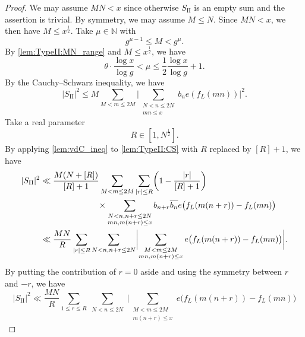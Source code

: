 \documentclass[hidelinks]{amsart}
\numberwithin{equation}{section}
\theoremstyle{plain}
\theoremstyle{definition}
\begin{document}
\begin{proof}
We may assume $MN<x$ since otherwise $S_{\mathrm{II}}$ is an empty sum
and the assertion is trivial.
By symmetry, we may assume $M\le N$.
Since $MN<x$, we then have $M\le x^{\frac{1}{2}}$.
Take $\mu\in\mathbb{N}$ with
\begin{equation}
\label{lem:TypeII:def:mu}
g^{\mu-1}\le M<g^{\mu}.
\end{equation}
By \cref{lem:TypeII:MN_range} and $M\le x^{\frac{1}{2}}$, we have
\begin{equation}
\label{lem:TypeII:mu_range}
\theta\cdot\frac{\log x}{\log g}<\mu\le\frac{1}{2}\frac{\log x}{\log g}+1.
\end{equation}
By the Cauchy--Schwarz inequality, we have
\begin{equation}
\label{lem:TypeII:CS}
|S_{\mathrm{II}}|^{2}
\le
M
\sum_{M<m\le 2M}
\biggl|
\sum_{\substack{
N<n\le 2N\\
mn\le x
}}
b_{n}
e(f_{L}(mn))
\biggr|^{2}.
\end{equation}
Take a real parameter
\begin{equation}
\label{lem:TypeII:R_range}
R\in[1,N^{\frac{1}{2}}].
\end{equation}
By applying \cref{lem:vdC_ineq} to \cref{lem:TypeII:CS} with $R$ replaced by $[R]+1$, we have
\begin{equation}
\label{lem:TypeII:vdC}
\begin{aligned}
|S_{\mathrm{II}}|^{2}
&\ll
\frac{M(N+[R])}{[R]+1}
\sum_{M<m\le 2M}
\sum_{|r|\le R}\biggl(1-\frac{|r|}{[R]+1}\biggr)\\
&\hspace{0.2\textwidth}
\times
\sum_{\substack{
N<n,n+r\le 2N\\
mn,m(n+r)\le x
}}
b_{n+r}\overline{b_{n}}
e\bigl(f_{L}(m(n+r))-f_{L}(mn)\bigr)\\
&\ll
\frac{MN}{R}
\sum_{|r|\le R}
\sum_{\substack{
N<n,n+r\le 2N
}}
\biggl|
\sum_{\substack{
M<m\le 2M\\
mn,m(n+r)\le x
}}
e\bigl(f_{L}(m(n+r))-f_{L}(mn)\bigr)
\biggr|.
\end{aligned}
\end{equation}
By putting the contribution of $r=0$ aside
and using the symmetry between $r$ and $-r$, we have
\begin{equation}
\label{lem:TypeII:vdC_clean}
|S_{\mathrm{II}}|^{2}
\ll
\frac{MN}{R}
\sum_{1\le r\le R}
\sum_{\substack{
N<n\le 2N
}}
\biggl|
\sum_{\substack{
M<m\le 2M\\
m(n+r)\le x
}}
e\bigl(f_{L}(m(n+r))-f_{L}(mn)\bigr)

\end{equation}
\end{proof}
\end{document}

